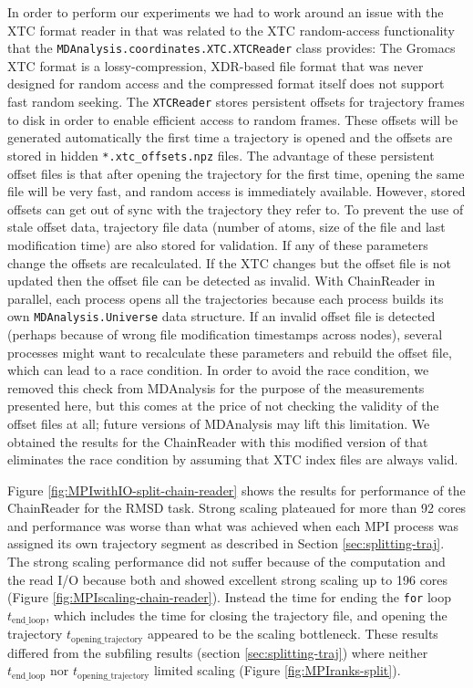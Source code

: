 In order to perform our experiments we had to work around an issue with the XTC format reader in  that was related to the XTC random-access functionality that the \texttt{MDAnalysis.coordinates.XTC.XTCReader} class provides:
The Gromacs XTC format \cite{Lindahl01, Spangberg:2011zr} is a lossy-compression, XDR-based file format that was never designed for random access and the compressed format itself does not support fast random seeking.
The \texttt{XTCReader} stores persistent offsets for trajectory frames to disk \cite{Gowers:2016aa} in order to enable efficient access to random frames.
These offsets will be generated automatically the first time a trajectory is opened and the offsets are stored in hidden \texttt{*.xtc\_offsets.npz} files. 
The advantage of these persistent offset files is that after opening the trajectory for the first time, opening the same file will be very fast, and random access is immediately available. 
However, stored offsets can get out of sync with the trajectory they refer to. 
To prevent the use of stale offset data, trajectory file data (number of atoms, size of the file and last modification time) are also stored for validation.
If any of these parameters change the offsets are recalculated. 
If the XTC changes but the offset file is not updated then the offset file can be detected as invalid.
With ChainReader in parallel, each process opens all the trajectories because each process builds its own \texttt{MDAnalysis.Universe} data structure.
If an invalid offset file is detected (perhaps because of wrong file modification timestamps across nodes), several processes might want to recalculate these parameters and rebuild the offset file, which can lead to a race condition.
In order to avoid the race condition, we removed this check from MDAnalysis for the purpose of the measurements presented here, but this comes at the price of not checking the validity of the offset files at all; future versions of MDAnalysis may lift this limitation.  
We obtained the results for the ChainReader with this modified version of  that eliminates the race condition by assuming that XTC index files are always valid.

Figure \ref{fig:MPIwithIO-split-chain-reader} shows the results for performance of the ChainReader for the RMSD task.
Strong scaling plateaued for more than 92 cores and performance was worse than what was achieved when each MPI process was assigned its own trajectory segment as described in Section \ref{sec:splitting-traj}. 
The strong scaling performance did not suffer because of the computation and the read I/O because both \tcomp and \tIO showed excellent strong scaling up to 196 cores (Figure \ref{fig:MPIscaling-chain-reader}).
Instead the time for ending the \texttt{for} loop $t_{\text{end\_loop}}$, which includes the time for closing the trajectory file, and opening the trajectory $t_{\text{opening\_trajectory}}$ appeared to be the scaling bottleneck.
These results differed from the subfiling results (section \ref{sec:splitting-traj}) where neither $t_{\text{end\_loop}}$ nor $t_{\text{opening\_trajectory}}$ limited scaling (Figure \ref{fig:MPIranks-split}). 

